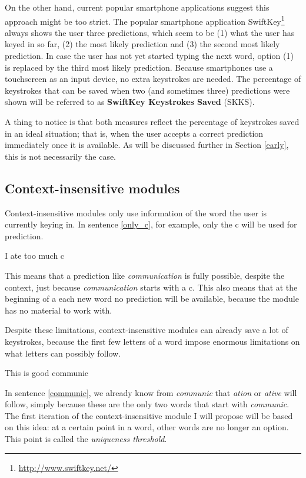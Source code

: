 \documentclass[11pt]{article}
\begin{document}
On the other hand, current popular smartphone applications suggest this approach might be too strict. The popular smartphone application SwiftKey\footnote{\url{http://www.swiftkey.net/}} always shows the user three predictions, which seem to be (1) what the user has keyed in so far, (2) the most likely prediction and (3) the second most likely prediction. In case the user has not yet started typing the next word, option (1) is replaced by the third most likely prediction. Because smartphones use a touchscreen as an input device, no extra keystrokes are needed. The percentage of keystrokes that can be saved when two (and sometimes three) predictions were shown will be referred to as \textbf{SwiftKey Keystrokes Saved} (SKKS).

A thing to notice is that both measures reflect the percentage of keystrokes saved in an ideal situation; that is, when the user accepts a correct prediction immediately once it is available. As will be discussed further in Section \ref{early}, this is not necessarily the case. 

\subsection{Context-insensitive modules} \label{ci}

Context-insensitive modules only use information of the word the user is currently keying in. In sentence \ref{only_c}, for example, only the c will be used for prediction. 

\begin{examples}
\item I ate too much c \label{only_c}
\end{examples}

This means that a prediction like \emph{communication} is fully possible, despite the context, just because \emph{communication} starts with a c. This also means that at the beginning of a each new word no prediction will be available, because the module has no material to work with.

Despite these limitations, context-insensitive modules can already save a lot of keystrokes, because the first few letters of a word impose enormous limitations on what letters can possibly follow.

\begin{examples}
\item This is good communic \label{communic}
\end{examples}

In sentence \ref{communic}, we already know from \emph{communic} that \emph{ation} or \emph{ative} will follow, simply because these are the only two words that start with \emph{communic}. The first iteration of the context-insensitive module I will propose will be based on this idea: at a certain point in a word, other words are no longer an option. This point is called the \emph{uniqueness threshold}.
\end{document}
